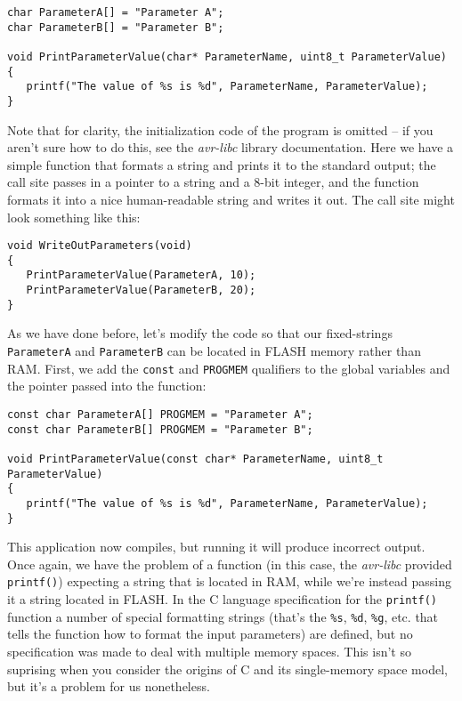 \documentclass[a4paper,oneside,notitlepage]{book}
\begin{document}
\begin{center}
\begin{lstlisting}
char ParameterA[] = "Parameter A";
char ParameterB[] = "Parameter B";

void PrintParameterValue(char* ParameterName, uint8_t ParameterValue)
{
   printf("The value of %s is %d", ParameterName, ParameterValue);
}
\end{lstlisting}
\end{center}

Note that for clarity, the initialization code of the program is omitted -- if you aren't sure how to do this, see the \textit{avr-libc} library documentation. Here we have a simple function that formats a string and prints it to the standard output; the call site passes in a pointer to a string and a 8-bit integer, and the function formats it into a nice human-readable string and writes it out. The call site might look something like this:

\begin{center}
\begin{lstlisting}
void WriteOutParameters(void)
{
   PrintParameterValue(ParameterA, 10);
   PrintParameterValue(ParameterB, 20);
}
\end{lstlisting}
\end{center}

As we have done before, let's modify the code so that our fixed-strings \lstinline{ParameterA} and \lstinline{ParameterB} can be located in FLASH memory rather than RAM. First, we add the \lstinline{const} and \lstinline{PROGMEM} qualifiers to the global variables and the pointer passed into the function:

\begin{center}
\begin{lstlisting}
const char ParameterA[] PROGMEM = "Parameter A";
const char ParameterB[] PROGMEM = "Parameter B";

void PrintParameterValue(const char* ParameterName, uint8_t ParameterValue)
{
   printf("The value of %s is %d", ParameterName, ParameterValue);
}
\end{lstlisting}
\end{center}

This application now compiles, but running it will produce incorrect output. Once again, we have the problem of a function (in this case, the \textit{avr-libc} provided \lstinline{printf()}) expecting a string that is located in RAM, while we're instead passing it a string located in FLASH. In the C language specification for the \lstinline{printf()} function a number of special formatting strings (that's the \lstinline{%s}, \lstinline{%d}, \lstinline{%g}, etc. that tells the function how to format the input parameters) are defined, but no specification was made to deal with multiple memory spaces. This isn't so suprising when you consider the origins of C and its single-memory space model, but it's a problem for us nonetheless.
\end{document}
